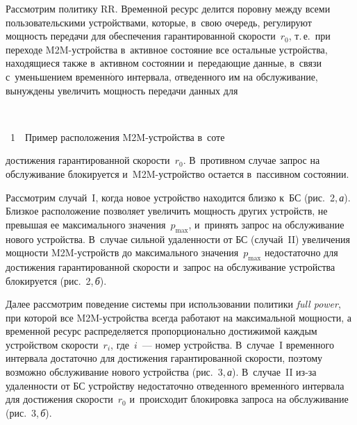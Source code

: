 \begin{multicols}{2}
   Рассмотрим политику RR. Временной ресурс делится поровну 
между всеми пользовательскими устройствами, которые, в~свою очередь, 
регулируют мощность передачи для обеспечения гарантированной 
скорости~$r_0$, т.\,е.\ при переходе M2M-устрой\-ст\-ва в~активное состояние 
все остальные устройства, находящиеся также в~активном состоянии 
и~передающие данные, в~связи с~уменьшением временн$\acute{\mbox{о}}$го интервала, 
отведенного им на обслуживание, вынуждены увеличить мощность передачи 
данных для\linebreak\vspace*{-12pt}


{ \begin{center}  %
 \vspace*{-3pt}
  \mbox{%
 \epsfxsize=79mm 
 }


\end{center}


\noindent
{{\figurename~1}\ \ \small{Пример расположения M2M-устройства в~соте}}
}

\vspace*{9pt}

\addtocounter{figure}{1} 

\noindent
 достижения гарантированной скорости~$r_0$. В~противном случае 
запрос на обслуживание блокируется и~M2M-устрой\-ст\-во остается 
в~пассивном со\-сто\-янии. 
  
  Рассмотрим случай~I, когда новое устройство находится близко к~БС 
(рис.~2,\,\textit{а}). Близкое расположение позволяет увеличить мощность других 
устройств, не превышая ее максимального значения~$p_{\max}$, и~принять 
запрос на обслуживание нового устройства. В~случае сильной удаленности от 
БС (случай~II) увеличения мощности M2M-устройств до максимального 
значения~$p_{\max}$ недостаточно для достижения гарантированной ско\-рости 
и~запрос на обслуживание устройства блокируется (рис.~2,\,\textit{б}). 
  



  Далее рассмотрим поведение системы при использовании политики 
\textit{full power}, при которой все M2M-устрой\-ст\-ва всегда работают на 
максимальной мощности, а временной ресурс распределяется пропорционально 
достижимой каждым устройством скорости~$r_i$, где~$i$~--- номер 
устройства. В~случае~I временного интервала достаточно для достижения 
гарантированной скорости, поэтому возможно обслуживание нового 
устройства (рис.~3,\,\textit{а}). В~случае~II из-за удаленности от БС устройству 
недостаточно отведенного временн$\acute{\mbox{о}}$го интервала для достижения 
скорости~$r_0$ и~происходит блокировка запроса на обслуживание (рис.~3,\,\textit{б}).
  



\end{multicols}

